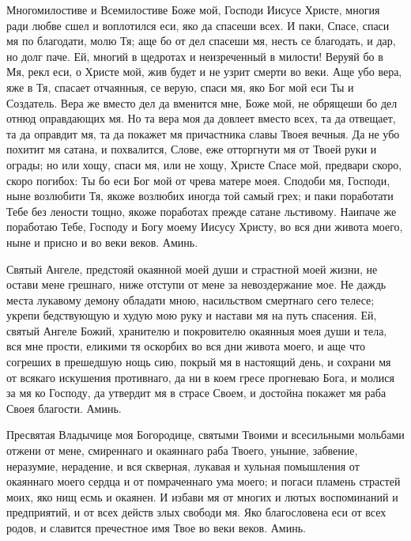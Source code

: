 \begin{mymulticols}
Многомилостиве и Всемилостиве Боже мой, Господи Иисусе Христе, многия ради любве сшел и воплотился еси, яко да спасеши всех. И паки, Спасе, спаси мя по благодати, молю Тя; аще бо от дел спасеши мя, несть се благодать, и дар, но долг паче. Ей, многий в щедротах и неизреченный в милости! Веруяй бо в Мя, рекл еси, о Христе мой, жив будет и не узрит смерти во веки. Аще убо вера, яже в Тя, спасает отчаянныя, се верую, спаси мя, яко Бог мой еси Ты и Создатель. Вера же вместо дел да вменится мне, Боже мой, не обрящеши бо дел отнюд оправдающих мя. Но та вера моя да довлеет вместо всех, та да отвещает, та да оправдит мя, та да покажет мя причастника славы Твоея вечныя. Да не убо похитит мя сатана, и похвалится, Слове, еже отторгнути мя от Твоей руки и ограды; но или хощу, спаси мя, или не хощу, Христе Спасе мой, предвари скоро, скоро погибох: Ты бо еси Бог мой от чрева матере моея. Сподоби мя, Господи, ныне возлюбити Тя, якоже возлюбих иногда той самый грех; и паки поработати Тебе без лености тощно, якоже поработах прежде сатане льстивому. Наипаче же поработаю Тебе, Господу и Богу моему Иисусу Христу, во вся дни живота моего, ныне и присно и во веки веков. Аминь.


Святый Ангеле, предстояй окаянной моей души и страстной моей жизни, не остави мене грешнаго, ниже отступи от мене за невоздержание мое. Не даждь места лукавому демону обладати мною, насильством смертнаго сего телесе; укрепи бедствующую и худую мою руку и настави мя на путь спасения. Ей, святый Ангеле Божий, хранителю и покровителю окаянныя моея души и тела, вся мне прости, еликими тя оскорбих во вся дни живота моего, и аще что согреших в прешедшую нощь сию, покрый мя в настоящий день, и сохрани мя от всякаго искушения противнаго, да ни в коем гресе прогневаю Бога, и молися за мя ко Господу, да утвердит мя в страсе Своем, и достойна покажет мя раба Своея благости. Аминь.


Пресвятая Владычице моя Богородице, святыми Твоими и всесильными мольбами отжени от мене, смиреннаго и окаяннаго раба Твоего, уныние, забвение, неразумие, нерадение, и вся скверная, лукавая и хульная помышления от окаяннаго моего сердца и от помраченнаго ума моего; и погаси пламень страстей моих, яко нищ есмь и окаянен. И избави мя от многих и лютых воспоминаний и предприятий, и от всех действ злых свободи мя. Яко благословена еси от всех родов, и славится пречестное имя Твое во веки веков. Аминь.


\end{mymulticols}
